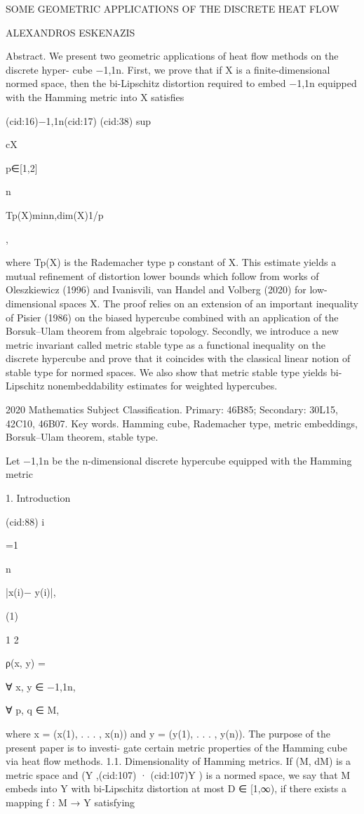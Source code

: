SOME GEOMETRIC APPLICATIONS OF THE DISCRETE HEAT FLOW

ALEXANDROS ESKENAZIS

Abstract. We present two geometric applications of heat ﬂow methods on the discrete hyper-
cube {−1,1}n. First, we prove that if X is a ﬁnite-dimensional normed space, then the bi-Lipschitz
distortion required to embed {−1,1}n equipped with the Hamming metric into X satisﬁes

(cid:16){−1,1}n(cid:17) (cid:38) sup

cX

p∈[1,2]

n

Tp(X)min{n,dim(X)}1/p

,

where Tp(X) is the Rademacher type p constant of X. This estimate yields a mutual reﬁnement
of distortion lower bounds which follow from works of Oleszkiewicz (1996) and Ivanisvili, van
Handel and Volberg (2020) for low-dimensional spaces X. The proof relies on an extension of
an important inequality of Pisier (1986) on the biased hypercube combined with an application
of the Borsuk–Ulam theorem from algebraic topology. Secondly, we introduce a new metric
invariant called metric stable type as a functional inequality on the discrete hypercube and prove
that it coincides with the classical linear notion of stable type for normed spaces. We also show
that metric stable type yields bi-Lipschitz nonembeddability estimates for weighted hypercubes.

2020 Mathematics Subject Classiﬁcation. Primary: 46B85; Secondary: 30L15, 42C10, 46B07.
Key words. Hamming cube, Rademacher type, metric embeddings, Borsuk–Ulam theorem, stable type.

Let {−1,1}n be the n-dimensional discrete hypercube equipped with the Hamming metric

1. Introduction

(cid:88) i

=1

n

|x(i)− y(i)|,

(1)

1 2

ρ(x, y) =

∀ x, y ∈ {−1,1}n,

∀ p, q ∈ M,

where x = (x(1), . . . , x(n)) and y = (y(1), . . . , y(n)). The purpose of the present paper is to investi-
gate certain metric properties of the Hamming cube via heat ﬂow methods.
1.1. Dimensionality of Hamming metrics. If (M, dM) is a metric space and (Y ,(cid:107) · (cid:107)Y ) is a
normed space, we say that M embeds into Y with bi-Lipschitz distortion at most D ∈ [1,∞),
if there exists a mapping f : M → Y satisfying

